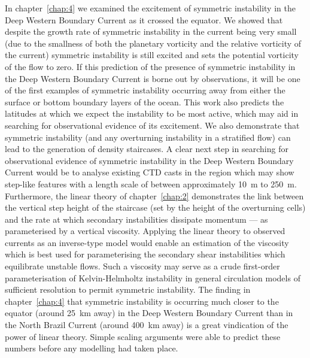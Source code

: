 In chapter~\ref{chap:4} we examined the excitement of symmetric instability in the Deep Western Boundary Current as it crossed the equator. We showed that despite the growth rate of symmetric instability in the current being very small (due to the smallness of both the planetary vorticity and the relative vorticity of the current) symmetric instability is still excited and sets the potential vorticity of the flow to zero. If this prediction of the presence of symmetric instability in the Deep Western Boundary Current is borne out by observations, it will be one of the first examples of symmetric instability occurring away from either the surface or bottom boundary layers of the ocean. This work also predicts the latitudes at which we expect the instability to be most active, which may aid in searching for observational evidence of its excitement. We also demonstrate that symmetric instability (and any overturning instability in a stratified flow) can lead to the generation of density staircases. A clear next step in searching for observational evidence of symmetric instability in the Deep Western Boundary Current would be to analyse existing CTD casts in the region which may show step-like features with a length scale of between approximately 10~m to 250~m. Furthermore, the linear theory of chapter~\ref{chap:2} demonstrates the link between the vertical step height of the staircase (set by the height of the overturning cells) and the rate at which secondary instabilities dissipate momentum --- as parameterised by a vertical viscosity. Applying the linear theory to observed currents as an inverse-type model would enable an estimation of the viscosity which is best used for parameterising the secondary shear instabilities which equilibrate unstable flows. Such a viscosity may serve as a crude first-order parameterisation of Kelvin-Helmholtz instability in general circulation models of sufficient resolution to permit symmetric instability. The finding in chapter~\ref{chap:4} that symmetric instability is occurring much closer to the equator (around 25~km away) in the Deep Western Boundary Current than in the North Brazil Current (around 400~km away) is a great vindication of the power of linear theory. Simple scaling arguments were able to predict these numbers before any modelling had taken place.


